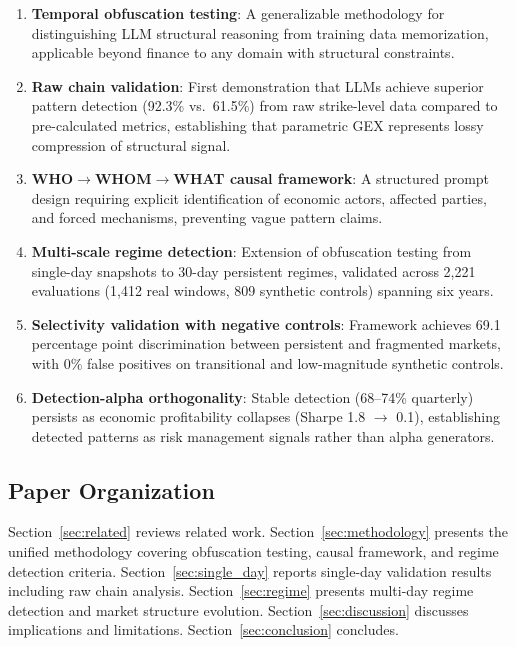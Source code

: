 \begin{enumerate}
\item \textbf{Temporal obfuscation testing}: A generalizable methodology for distinguishing LLM structural reasoning from training data memorization, applicable beyond finance to any domain with structural constraints.

\item \textbf{Raw chain validation}: First demonstration that LLMs achieve superior pattern detection (92.3\% vs.\ 61.5\%) from raw strike-level data compared to pre-calculated metrics, establishing that parametric GEX represents lossy compression of structural signal.

\item \textbf{WHO$\rightarrow$WHOM$\rightarrow$WHAT causal framework}: A structured prompt design requiring explicit identification of economic actors, affected parties, and forced mechanisms, preventing vague pattern claims.

\item \textbf{Multi-scale regime detection}: Extension of obfuscation testing from single-day snapshots to 30-day persistent regimes, validated across 2,221 evaluations (1,412 real windows, 809 synthetic controls) spanning six years.

\item \textbf{Selectivity validation with negative controls}: Framework achieves 69.1 percentage point discrimination between persistent and fragmented markets, with 0\% false positives on transitional and low-magnitude synthetic controls.

\item \textbf{Detection-alpha orthogonality}: Stable detection (68--74\% quarterly) persists as economic profitability collapses (Sharpe 1.8 $\rightarrow$ 0.1), establishing detected patterns as risk management signals rather than alpha generators.
\end{enumerate}

\subsection{Paper Organization}

Section~\ref{sec:related} reviews related work. Section~\ref{sec:methodology} presents the unified methodology covering obfuscation testing, causal framework, and regime detection criteria. Section~\ref{sec:single_day} reports single-day validation results including raw chain analysis. Section~\ref{sec:regime} presents multi-day regime detection and market structure evolution. Section~\ref{sec:discussion} discusses implications and limitations. Section~\ref{sec:conclusion} concludes.
